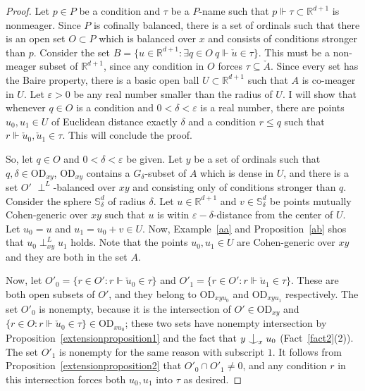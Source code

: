 \documentclass{article}
\newcommand{\gd}{\delta}
\newcommand{\eps}{\varepsilon}
\newcommand{\vd}{\mathrm{OD}}
\newcommand{\forkindep}[1][]{%
  \mathrel{
    \mathop{
      \vcenter{
        \hbox{\oalign{\noalign{\kern-.3ex}\hfil$\vert$\hfil\cr
              \noalign{\kern-.7ex}
              $\smile$\cr\noalign{\kern-.3ex}}}
      }
    }\displaylimits_{#1}
  }
}
\theoremstyle{definition}
\begin{document}
\begin{proof}
Let $p\in P$ be a condition and $\tau$ be a $P$-name such that $p\Vdash\tau\subset\mathbb{R}^{d+1}$ is nonmeager. Since $P$ is cofinally balanced, there is a set of ordinals such that there is an open set $O\subset P$ which is balanced over $x$ and consists of conditions stronger than $p$. Consider the set $B=\{u\in\mathbb{R}^{d+1}\colon\exists q\in O\ q\Vdash\check u\in\tau\}$. This must be a non-meager subset of $\mathbb{R}^{d+1}$, since any condition in $O$ forces $\tau\subseteq\check A$. Since every set has the Baire property, there is a basic open ball $U\subset\mathbb{R}^{d+1}$ such that $A$ is co-meager in $U$. Let $\eps>0$ be any real number smaller than the radius of $U$. I will show that whenever $q\in O$ is a condition and $0<\gd<\eps$ is a real number, there are points $u_0, u_1\in U$ of Euclidean distance exactly $\gd$ and a condition $r\leq q$ such that $r\Vdash\check u_0, \check u_1\in\tau$. This will conclude the proof.

So, let $q\in O$ and $0<\gd<\eps$ be given. Let $y$ be a set of ordinals such that $q, \delta\in\vd_{xy}$, $\vd_{xy}$ contains a $G_\delta$-subset of $A$ which is dense in $U$, and there is a set $O'$ $\perp^L$-balanced over $xy$ and consisting only of conditions stronger than $q$. Consider the sphere $\mathbb{S}^{d}_\delta$ of radius $\delta$. Let $u\in \mathbb{R}^{d+1}$ and $v\in\mathbb{S}^{d}_\delta$ be points mutually Cohen-generic over ${xy}$ such that $u$ is witin $\eps-\delta$-distance from the center of $U$. Let $u_0=u$ and $u_1=u_0+v\in U$. Now, Example~\ref{aa} and Proposition~\ref{ab} shos that $u_0\perp^L_{xy}u_1$ holds. Note that the points $u_0, u_1\in U$ are Cohen-generic over ${xy}$ and they are both in the set $A$.

Now, let $O'_0=\{r\in O'\colon r\Vdash\check u_0\in\tau\}$ and $O'_1=\{r\in O'\colon r\Vdash\check u_1\in\tau\}$. These are both open subsets of $O'$, and they belong to $\vd_{xyu_0}$ and $\vd_{xyu_1}$ respectively. The set $O'_0$ is nonempty, because it is the intersection of $O'\in\vd_{xy}$ and $\{r\in O\colon r\Vdash\check u_0\in\tau\}\in\vd_{xu_0}$; these two sets have nonempty intersection by Proposition~\ref{extensionproposition1} and the fact that $y\forkindep[x]u_0$ (Fact~\ref{fact2}(2)). The set $O'_1$ is nonempty for the same reason with subscript $1$. It follows from Proposition~\ref{extensionproposition2} that $O'_0\cap O'_1\neq 0$, and any condition $r$ in this intersection forces both $u_0, u_1$ into $\tau$ as desired.
\end{proof}
\end{document}

